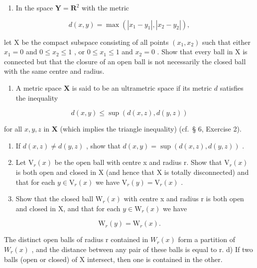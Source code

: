 \begin{enumerate}
\def\labelenumi{\alph{enumi})}
\setcounter{enumi}{1}
\tightlist
\item
  In the space \(\mathbf{Y} = \mathbf{R}^2\) with the metric
\end{enumerate}

\[
d (x, y) = \max \left(\left| x _ {1} - y _ {1} \right|, \left| x _ {2} - y _ {2} \right|\right),
\]

let X be the compact subspace consisting of all points \((x_{1}, x_{2})\) such that either \(x_{1} = 0\) and \(0 \leqslant x_{2} \leqslant 1\) , or \(0 \leqslant x_{1} \leqslant 1\) and \(x_{2} = 0\) . Show that every ball in X is connected but that the closure of an open ball is not necessarily the closed ball with the same centre and radius.

\begin{enumerate}
\def\labelenumi{\arabic{enumi})}
\setcounter{enumi}{3}
\tightlist
\item
  A metric space \(\mathbf{X}\) is said to be an ultrametric space if its metric \(d\) satisfies the inequality
\end{enumerate}

\[
d (x, y) \leqslant \sup \left(d (x, z), d (y, z)\right)
\]

for all \(x, y, z\) in \(\mathbf{X}\) (which implies the triangle inequality) (cf.~§ 6, Exercise 2).

\begin{enumerate}
\def\labelenumi{\alph{enumi})}
\item
  If \(d(x, z) \neq d(y, z)\) , show that \(d(x, y) = \sup (d(x, z), d(y, z))\) .
\item
  Let \(\mathrm{V}_{r}(x)\) be the open ball with centre x and radius r. Show that \(\mathrm{V}_{r}(x)\) is both open and closed in X (and hence that X is totally disconnected) and that for each \(y \in \mathrm{V}_{r}(x)\) we have \(\mathrm{V}_{r}(y) = \mathrm{V}_{r}(x)\) .
\item
  Show that the closed ball \(\mathrm{W}_{r}(x)\) with centre x and radius r is both open and closed in X, and that for each \(y \in \mathrm{W}_{r}(x)\) we have
\end{enumerate}

\[
\mathrm{W} _ {r} (y) = \mathrm{W} _ {r} (x).
\]

The distinct open balls of radius r contained in \(W_{r}(x)\) form a partition of \(W_{r}(x)\) , and the distance between any pair of these balls is equal to r. d) If two balls (open or closed) of X intersect, then one is contained in the other.

